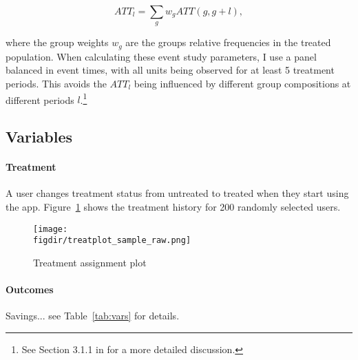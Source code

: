 \begin{equation}
    ATT_l = \sum_g w_g ATT(g,g+l),
\end{equation}

where the group weights $w_g$ are the groups relative frequencies in the
treated population. When calculating these event study parameters, I use a
panel balanced in event times, with all units being observed for at least 5
treatment periods. This avoids the $ATT_l$ being influenced by different
group compositions at different periods $l$.\footnote{See Section 3.1.1 in
\citet{callaway2021difference} for a more detailed discussion.}


\subsection{Variables}%
\label{sub:variables}



\paragraph{Treatment}%
\label{par:treatment}

A user changes treatment status from untreated to treated when they start using
the app. Figure~\ref{fig:treatplot_sample_raw} shows the treatment history for
200 randomly selected users.

\begin{figure}[H]
    \centering
    \caption{Treatment assignment plot}%
    \texttt{[image: \\figdir/treatplot\_sample\_raw.png]}
    \label{fig:treatplot_sample_raw}


\end{figure}


\paragraph{Outcomes}%
\label{par:outcomes}

Savings... see Table~\ref{tab:vars} for details.

